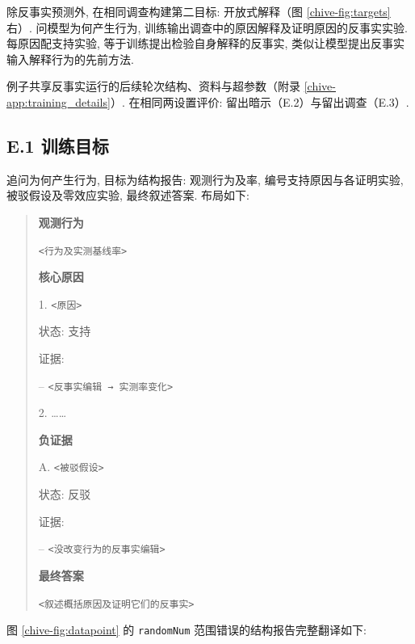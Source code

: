 除反事实预测外, 在相同调查构建第二目标: 开放式解释（图 \ref{chive-fig:targets} 右）. 问模型为何产生行为, 训练输出调查中的原因解释及证明原因的反事实实验. 每原因配支持实验, 等于训练提出检验自身解释的反事实, 类似让模型提出反事实输入解释行为的先前方法\cite{chive-mayne2025llmsdontknowdecision,chive-dehghanighobadi2025llmsexplaincounterfactually}.

例子共享反事实运行的后续轮次结构、资料与超参数（附录 \ref{chive-app:training_details}）. 在相同两设置评价: 留出暗示（E.2）与留出调查（E.3）.

\subsection*{E.1 训练目标}
追问为何产生行为, 目标为结构报告: 观测行为及率, 编号支持原因与各证明实验, 被驳假设及零效应实验, 最终叙述答案. 布局如下:
\begin{quote}
\textbf{观测行为}\par
\texttt{<行为及实测基线率>}

\textbf{核心原因}\par
1. \texttt{<原因>}\par
状态: 支持\par
证据:\par
-- \texttt{<反事实编辑 → 实测率变化>}\par
2. ……

\textbf{负证据}\par
A. \texttt{<被驳假设>}\par
状态: 反驳\par
证据:\par
-- \texttt{<没改变行为的反事实编辑>}

\textbf{最终答案}\par
\texttt{<叙述概括原因及证明它们的反事实>}
\end{quote}
图 \ref{chive-fig:datapoint} 的 \texttt{randomNum} 范围错误的结构报告完整翻译如下:
